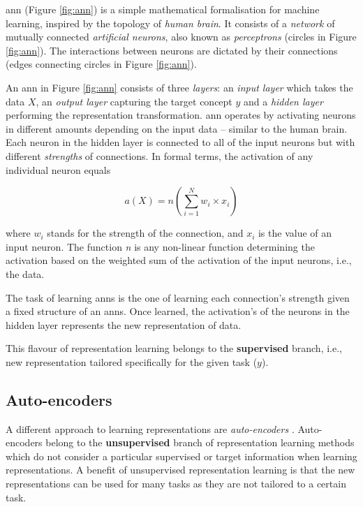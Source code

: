 \gls{ann} (Figure \ref{fig:ann}) is a simple mathematical formalisation for machine learning, inspired by the topology of  \textit{human brain}.
It consists of a \textit{network} of mutually connected \textit{artificial neurons}, also known as \textit{perceptrons} (circles in Figure \ref{fig:ann}).
The interactions between neurons are dictated by their connections (edges connecting circles in Figure \ref{fig:ann}).




An \gls{ann} in Figure \ref{fig:ann} consists of three \textit{layers}: an \textit{input layer} which takes the data $X$, an \textit{output layer} capturing the target concept $y$ and a \textit{hidden layer} performing the representation transformation.
\gls{ann} operates by activating neurons in different amounts depending on the input data -- similar to the human brain.
Each neuron in the hidden layer is connected to all of the input neurons but with different \textit{strengths} of connections.
In formal terms, the  activation of any individual neuron equals

\begin{equation}
	a(X) = n(\sum_{i=1}^N w_i \times x_i)
\end{equation}

where $w_i$ stands for the strength of the connection, and $x_i$ is the value of an input neuron.
The function \textit{n} is any non-linear function determining the activation based on the weighted sum of the activation of the input neurons, i.e., the data.




The task of learning \gls{ann}s is the one of learning each connection's strength given a fixed structure of an \gls{ann}s.
Once learned, the activation's of the neurons in the hidden layer represents the new representation of data.



This flavour of representation learning belongs to the \textbf{supervised} branch, i.e.,  new representation tailored specifically for the given task ($y$).




\subsection{Auto-encoders}


A  different approach to learning representations are \textit{auto-encoders} \cite{Hinton504}.
Auto-encoders belong to the \textbf{unsupervised} branch of representation learning methods which do not consider a particular supervised or target information when learning representations.
A benefit of unsupervised representation learning is that the new representations can be used for many tasks as they are not tailored to a certain task.


